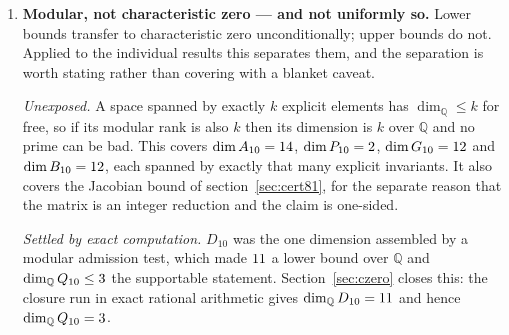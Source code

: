 \documentclass[11pt,a4paper]{article}
\begin{document}
\begin{enumerate}
\item \textbf{Modular, not characteristic zero --- and not uniformly so.} Lower
      bounds transfer to characteristic zero unconditionally; upper bounds do
      not. Applied to the individual results this separates them, and the
      separation is worth stating rather than covering with a blanket caveat.

      \emph{Unexposed.} A space spanned by exactly $k$ explicit elements has
      $\dim_{\mathbb{Q}} \le k$ for free, so if its modular rank is also $k$ then
      its dimension is $k$ over $\mathbb{Q}$ and no prime can be bad. This
      covers $\dim A_{10} = 14$, $\dim P_{10} = 2$,
      $\dim G_{10} = 12$ and $\dim B_{10} = 12$, each spanned by
      exactly that many explicit invariants. It also covers the Jacobian bound
      of section~\ref{sec:cert81}, for the separate reason that the matrix is an
      integer reduction and the claim is one-sided.

      \emph{Settled by exact computation.} $D_{10}$ was the one dimension
      assembled by a modular admission test, which made $11$ a lower bound
      over $\mathbb{Q}$ and $\dim_{\mathbb{Q}} Q_{10} \le 3$ the
      supportable statement. Section~\ref{sec:czero} closes this: the closure
      run in exact rational arithmetic gives
      $\dim_{\mathbb{Q}} D_{10} = 11$ and hence
      $\dim_{\mathbb{Q}} Q_{10} = 3$.


\end{enumerate}
\end{document}
